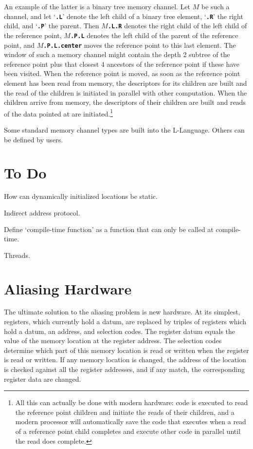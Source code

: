 \documentclass[12pt]{article}
\newcommand{\TT}[1]{{\tt \bfseries #1}}
\begin{document}
An example of the latter is a binary tree memory channel.
Let $M$ be such a channel, and let `\TT{.L}' denote the left
child of a binary tree element, `\TT{.R}' the right child, and
`\TT{.P}' the parent.  Then $M\!$\TT{.L.R} denotes the right
child of the left child of the reference point, $M\!$\TT{.P.L}
denotes the left child of the parent of the reference point,
and $M\!$\TT{.P.L.center} moves the reference point to this last element.
The window of such a memory channel might contain the depth 2
subtree of the reference point plus that closest 4 ancestors of the
reference point if these have been visited.  When the reference
point is moved, as soon as the reference point element has been
read from memory, the descriptors for its children are built and
the read of the children is initiated in parallel with other
computation.  When the children arrive from memory, the descriptors
of their children are built and reads of the data pointed at
are initiated.\footnote{All this can actually be done with modern
hardware: code is executed to read the reference point children and initiate the
reads of their children, and a modern processor will automatically
save the code that
executes when a read of a reference point child completes and execute
other code in parallel until the read does complete.}

Some standard memory channel types are built into the L-Language.
Others can be defined by users.

\section{To Do}

How can dynamically initialized locations be static.

Indirect address protocol.

Define `compile-time function' as a function that can only be
called at compile-time.

\label{INDIRECT-ADDRESS-PROTOCOL}

Threads.
\label{THREADS}

\appendix

\section{Aliasing Hardware}
\label{ALIASING-HARDWARE}

The ultimate solution to the aliasing problem is new hardware.
At its simplest, registers, which currently hold a datum,
are replaced by triples of registers which hold a datum,
an address, and selection codes.  The register datum equals the value
of the memory location at the register address.  The selection
codes determine which part of this memory location is read or written
when the register is read or written.  If any memory location is
changed, the address of the location is checked against all the
register addresses, and if any match, the corresponding register
data are changed.
\end{document}
